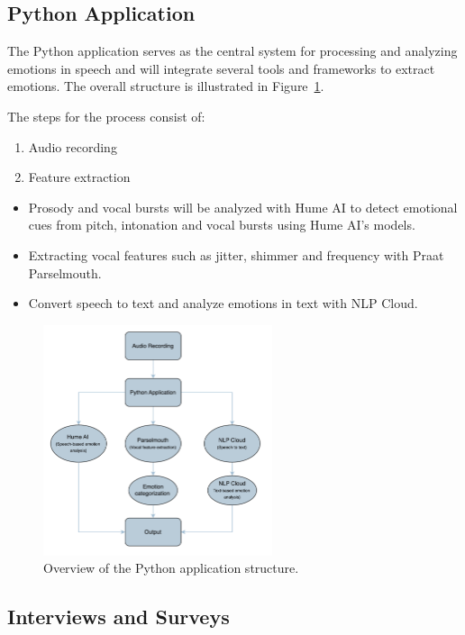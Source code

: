 \subsection{Python Application}

The Python application serves as the central system for processing and analyzing emotions in speech and will integrate several tools and frameworks to extract emotions. The overall structure is illustrated in Figure~\ref{fig:tf-python-app}.

The steps for the process consist of:

\begin{enumerate}
    \item Audio recording
    \item Feature extraction
\end{enumerate}

\begin{itemize}
    \item Prosody and vocal bursts will be analyzed with Hume AI to detect emotional cues from pitch, intonation and vocal bursts using Hume AI’s models.
    \item Extracting vocal features such as jitter, shimmer and frequency with Praat Parselmouth.
    \item Convert speech to text and analyze emotions in text with NLP Cloud.
\end{itemize}

\begin{figure}[H]
    \centering
    \includegraphics[width=0.6\textwidth]{png/results/rq1_nr3/python-app.pdf}
    \caption{Overview of the Python application structure.}
    \label{fig:tf-python-app}
\end{figure}
    

\subsection{Interviews and Surveys}
\label{sec:theo-interviews}

